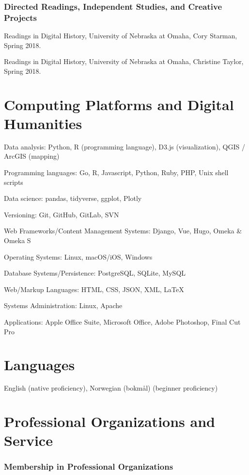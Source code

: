 \subsubsection{Directed Readings, Independent Studies, and Creative
Projects}\label{directed-readings-independent-studies-and-creative-projects}

Readings in Digital History, University of Nebraska at Omaha, Cory
Starman, Spring 2018.

Readings in Digital History, University of Nebraska at Omaha, Christine
Taylor, Spring 2018.

\section{Computing Platforms and Digital
Humanities}\label{computing-platforms-and-digital-humanities}

Data analysis: Python, R (programming language), D3.js (visualization),
QGIS / ArcGIS (mapping)

Programming languages: Go, R, Javascript, Python, Ruby, PHP, Unix shell
scripts

Data science: pandas, tidyverse, ggplot, Plotly

Versioning: Git, GitHub, GitLab, SVN

Web Frameworks/Content Management Systems: Django, Vue, Hugo, Omeka \&
Omeka S

Operating Systems: Linux, macOS/iOS, Windows

Database Systems/Persistence: PostgreSQL, SQLite, MySQL

Web/Markup Languages: HTML, CSS, JSON, XML, \LaTeX

Systems Administration: Linux, Apache

Applications: Apple Office Suite, Microsoft Office, Adobe Photoshop,
Final Cut Pro

\section{Languages}\label{languages}

English (native proficiency), Norwegian (bokm\r{a}l) (beginner
proficiency)

\section{Professional Organizations and
Service}\label{professional-organizations-and-service}

\subsubsection{Membership in Professional
Organizations}\label{membership-in-professional-organizations}

